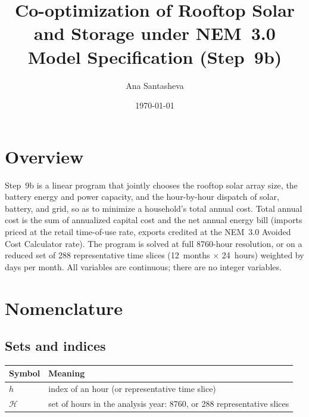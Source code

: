 \documentclass[11pt]{article}
\title{Co-optimization of Rooftop Solar and Storage under NEM~3.0\\[2pt]
       \large Model Specification (Step~9b)}
\author{Ana Santasheva}
\date{\today}
\begin{document}
\maketitle

\section{Overview}

Step~9b is a linear program that jointly chooses the rooftop solar array size, the
battery energy and power capacity, and the hour-by-hour dispatch of solar, battery, and
grid, so as to minimize a household's total annual cost. Total annual cost is the sum of
annualized capital cost and the net annual energy bill (imports priced at the retail
time-of-use rate, exports credited at the NEM~3.0 Avoided Cost Calculator rate). The
program is solved at full 8760-hour resolution, or on a reduced set of 288 representative
time slices (12~months $\times$ 24~hours) weighted by days per month. All variables are
continuous; there are no integer variables.

\section{Nomenclature}

\subsection*{Sets and indices}
\begin{tabular}{@{}l L{0.72\textwidth}@{}}
\toprule
Symbol & Meaning \\
\midrule
$h$ & index of an hour (or representative time slice) \\
$\mathcal{H}$ & set of hours in the analysis year: 8760, or 288 representative slices \\
\bottomrule
\end{tabular}
\end{document}
